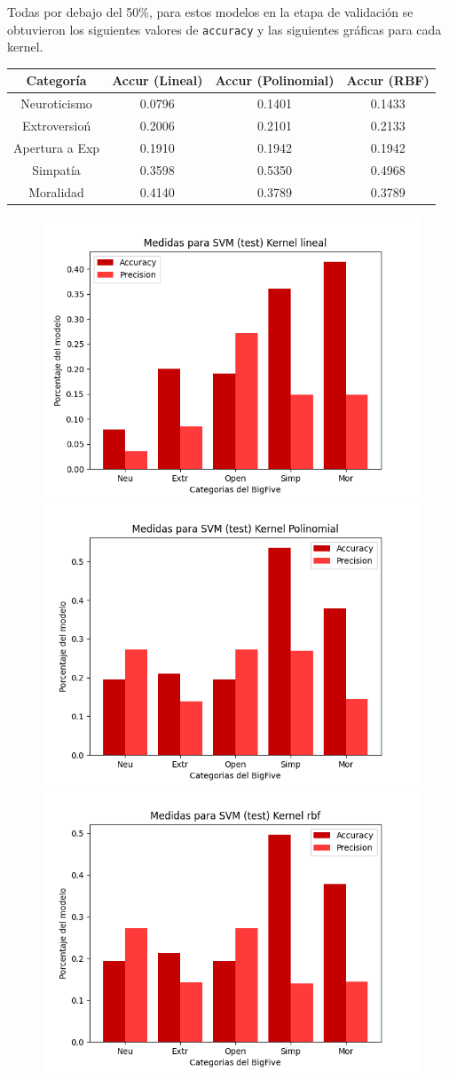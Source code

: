\documentclass[10pt, a4paper]{article}
\begin{document}
            Todas por debajo del 50\%, para estos modelos en la etapa de validaci\'on se obtuvieron los 
            siguientes valores de \texttt{accuracy} y las siguientes gr\'aficas para cada kernel. \\ 

            \begin{tabular}[H]{|c|c|c|c|}

                \hline Categor\'ia & Accur (Lineal) & Accur (Polinomial) & Accur (RBF) \\  
                \hline Neuroticismo             & 0.0796 & 0.1401  &  0.1433\\
                \hline Extroversio\'n           & 0.2006 & 0.2101  &  0.2133\\
                \hline Apertura a Exp  & 0.1910 & 0.1942  &  0.1942\\
                \hline Simpat\'ia               & 0.3598 & 0.5350  &  0.4968\\
                \hline Moralidad                & 0.4140 & 0.3789  &  0.3789\\
                \hline
            \end{tabular}

            \begin{figure}[H]
                \centering
                \includegraphics[width = 0.3\linewidth]{final_lineal10.png}
                \includegraphics[width = 0.3\linewidth]{final_polinomial10.png}
                \includegraphics[width = 0.3\linewidth]{final_rbf10.png}

            \end{figure}
\end{document}
